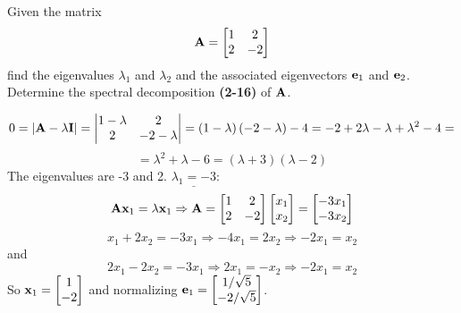         Given the matrix
        \[
            \bold{A} = \begin{bmatrix}
                1 & 2 \\
                2 & -2
            \end{bmatrix}
        \]
        find the eigenvalues $\lambda_1$ and $\lambda_2$ and the associated eigenvectors $\bold{e}_1$ and $\bold{e}_2$. Determine the spectral decomposition \textbf{(2-16)} of $\bold{A}$.
        \par
        \[
            0 = \left|\bold{A} - \lambda\bold{I}\right|
            =
            \left|
            \begin{matrix}
                1 - \lambda & 2 \\
                2 & -2 - \lambda
            \end{matrix}
            \right|
            =
            \left(1 - \lambda\right)\left(-2-\lambda\right) - 4
            =
            -2 + 2\lambda - \lambda + \lambda^2 - 4
            =
        \]
        \[
            = \lambda^2 + \lambda - 6
            = \left(\lambda + 3 \right)\left(\lambda - 2\right)
        \]
        The eigenvalues are -3 and 2.
        \newline
        $\underline{\lambda_1 = -3}$:
        \[
            \bold{A}\bold{x}_1 = \lambda\bold{x}_1
            \Rightarrow
            \bold{A} = \begin{bmatrix}
                1 & 2 \\
                2 & -2
            \end{bmatrix}
            \begin{bmatrix}
                x_1 \\
                x_2
            \end{bmatrix}
            =
            \begin{bmatrix}
                -3x_1 \\
                -3x_2
            \end{bmatrix}
        \]
        \[
            x_1 + 2x_2 = -3x_1
            \Rightarrow
            -4x_1 = 2x_2
            \Rightarrow
            -2x_1 = x_2
        \]
        and
        \[
            2x_1 - 2x_2 = -3x_1
            \Rightarrow
            2x_1 = -x_2
            \Rightarrow
            -2x_1 = x_2
        \]
        So $\bold{x}_1 = \begin{bmatrix}
            1 \\
            -2
        \end{bmatrix}$ and normalizing $\bold{e}_1 = \begin{bmatrix}
            1/\sqrt{5} \\
            -2/\sqrt{5}
        \end{bmatrix}$.
